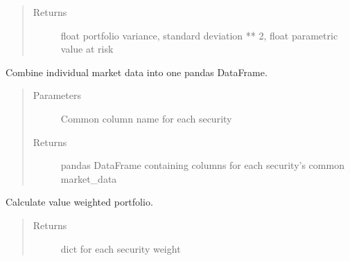 \documentclass[letterpaper,10pt,english]{sphinxmanual}
\begin{document}
\begin{fulllineitems}
\begin{fulllineitems}
\begin{quote}
\begin{description}
\begin{itemize}
\end{itemize}

\item[{Returns}] \leavevmode
float portfolio variance, standard deviation ** 2, float parametric value at risk

\end{description}\end{quote}

\end{fulllineitems}


\begin{fulllineitems}
\label{\detokenize{securities:risk_dash.securities.Portfolio.set_portfolio_marketdata}}
Combine individual market data into one pandas DataFrame.
\begin{quote}\begin{description}
\item[{Parameters}] \leavevmode
{} \textendash{} Common column name for each security

\item[{Returns}] \leavevmode
pandas DataFrame containing columns for each security’s common market\_data

\end{description}\end{quote}

\end{fulllineitems}


\begin{fulllineitems}
\label{\detokenize{securities:risk_dash.securities.Portfolio.set_weights}}
Calculate value weighted portfolio.
\begin{quote}\begin{description}
\item[{Returns}] \leavevmode
dict for each security weight

\end{description}\end{quote}

\end{fulllineitems}


\end{fulllineitems}
\end{document}
